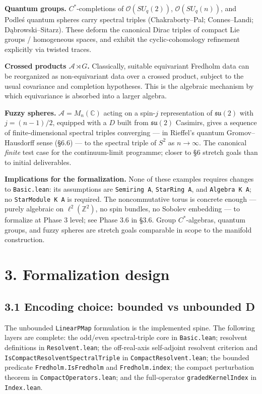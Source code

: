 \documentclass[
  11pt,
]{article}
\begin{document}
\textbf{Quantum groups.} \(C^*\)-completions of
\(\mathcal{O}(SU_q(2))\), \(\mathcal{O}(SU_q(n))\), and Podleś quantum
spheres carry spectral triples (Chakraborty--Pal; Connes--Landi;
Dąbrowski--Sitarz). These deform the canonical Dirac triples of compact
Lie groups / homogeneous spaces, and exhibit the cyclic-cohomology
refinement explicitly via twisted traces.

\textbf{Crossed products \(\mathcal{A}\rtimes G\).} Classically,
suitable equivariant Fredholm data can be reorganized as non-equivariant
data over a crossed product, subject to the usual covariance and
completion hypotheses. This is the algebraic mechanism by which
equivariance is absorbed into a larger algebra.

\textbf{Fuzzy spheres.} \(\mathcal{A}= M_n(\mathbb{C})\) acting on a
spin-\(j\) representation of \(\mathfrak{su}(2)\) with \(j = (n-1)/2\),
equipped with a \(D\) built from \(\mathfrak{su}(2)\) Casimirs, gives a
sequence of finite-dimensional spectral triples converging --- in
Rieffel's quantum Gromov--Hausdorff sense (§6.6) --- to the spectral
triple of \(S^2\) as \(n \to \infty\). The canonical \emph{finite} test
case for the continuum-limit programme; closer to §6 stretch goals than
to initial deliverables.

\textbf{Implications for the formalization.} None of these examples
requires changes to \texttt{Basic.lean}: its assumptions are
\texttt{Semiring\ A}, \texttt{StarRing\ A}, and
\texttt{Algebra\ K\ A}; no \texttt{StarModule\ K\ A} is required. The
noncommutative torus is
concrete enough --- purely algebraic on \(\ell^2(\mathbb{Z}^2)\), no
spin bundles, no Sobolev embedding --- to formalize at Phase 3 level;
see Phase 3.6 in §3.6. Group \(C^*\)-algebras, quantum groups, and fuzzy
spheres are stretch goals comparable in scope to the manifold
construction.

\section{3. Formalization design}\label{formalization-design}

\subsection{3.1 Encoding choice: bounded vs unbounded
D}\label{encoding-choice-bounded-vs-unbounded-d}

The unbounded \texttt{LinearPMap} formulation is the implemented spine.
The following layers are complete: the odd/even spectral-triple core in
\texttt{Basic.lean}; resolvent definitions in \texttt{Resolvent.lean};
the off-real-axis self-adjoint resolvent criterion and
\texttt{IsCompactResolventSpectralTriple} in
\texttt{CompactResolvent.lean}; the bounded predicate
\texttt{Fredholm.IsFredholm} and \texttt{Fredholm.index}; the compact
perturbation theorem in \texttt{CompactOperators.lean}; and the
full-operator \texttt{gradedKernelIndex} in \texttt{Index.lean}.
\end{document}
